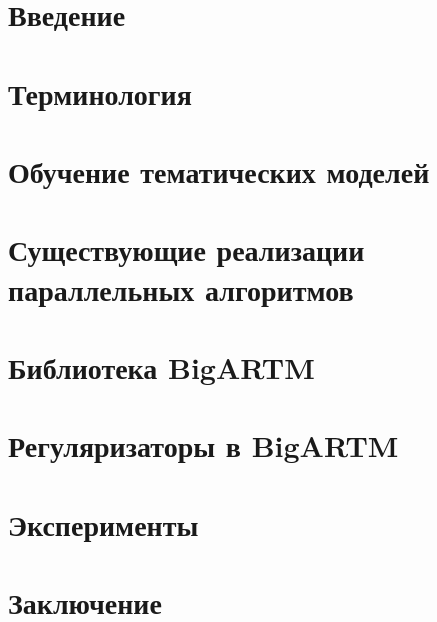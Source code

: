 \documentclass[12pt]{article}
\begin{document}
\tableofcontents
\newpage

\section{Введение}\label{introduction}


\section{Терминология}\label{defenitions}


\section{Обучение тематических моделей}\label{learning}


\section{Существующие реализации параллельных алгоритмов}\label{overview}


\section{Библиотека BigARTM}\label{library}


\section{Регуляризаторы в BigARTM}\label{regularizers}


\section{Эксперименты}\label{experiments}



\section{Заключение}\label{results}

\end{document}
